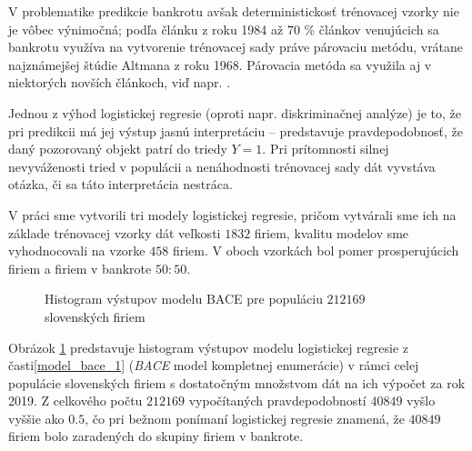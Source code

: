 V problematike predikcie bankrotu avšak deterministickosť trénovacej vzorky nie je vôbec výnimočná;
podľa článku \cite{zmijewski} z roku 1984 až 70 \% článkov venujúcich sa bankrotu využíva na vytvorenie trénovacej sady práve párovaciu metódu, vrátane najznámejšej štúdie Altmana z roku 1968.
Párovacia metóda sa využila aj v niektorých novších článkoch, viď napr. \cite{bodle}.

Jednou z výhod logistickej regresie (oproti napr. diskriminačnej analýze) je to, že pri predikcii má jej výstup jasnú interpretáciu –
predstavuje pravdepodobnosť, že daný pozorovaný objekt patrí do triedy \(Y = 1\).
Pri prítomnosti silnej nevyváženosti tried v populácii a nenáhodnosti trénovacej sady dát vyvstáva otázka, či sa táto interpretácia nestráca.

V práci sme vytvorili tri modely logistickej regresie, pričom vytvárali sme ich na základe trénovacej vzorky dát veľkosti \(1832\) firiem, kvalitu modelov sme vyhodnocovali na vzorke \(458\) firiem.
V oboch vzorkách bol pomer prosperujúcich firiem a firiem v bankrote \(50:50\).

\begin{figure}
\caption{Histogram výstupov modelu BACE pre populáciu \(212169\) slovenských firiem}
\label{model_bace_whole_pop}
\end{figure}

Obrázok \ref{model_bace_whole_pop} predstavuje histogram výstupov modelu logistickej regresie z časti\autoref{model_bace_1} (\emph{BACE} model kompletnej enumerácie)
v rámci celej populácie slovenských firiem s dostatočným množstvom dát na ich výpočet za rok 2019.
Z celkového počtu \(212169\) vypočítaných pravdepodobností \(40849\) vyšlo vyššie ako \(0.5\),
čo pri bežnom ponímaní logistickej regresie znamená, že \(40849\) firiem bolo zaradených do skupiny firiem v bankrote.

